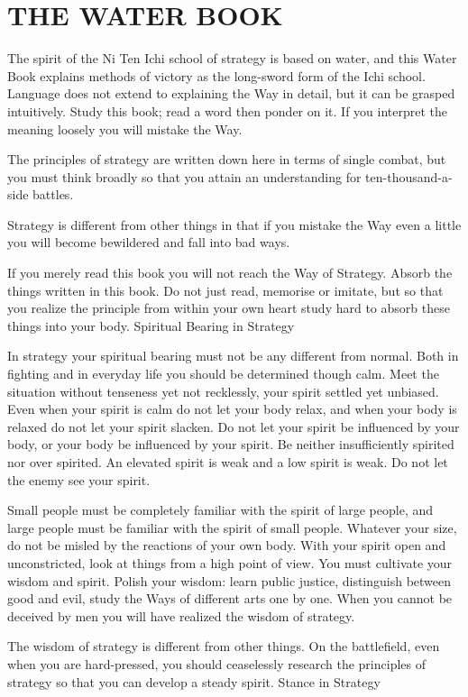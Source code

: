 \chapter{THE WATER BOOK}

The spirit of the Ni Ten Ichi school of strategy is based on water, and this Water Book explains methods of victory as the long-sword form of the Ichi school. Language does not extend to explaining the Way in detail, but it can be grasped intuitively. Study this book; read a word then ponder on it. If you interpret the meaning loosely you will mistake the Way.

The principles of strategy are written down here in terms of single combat, but you must think broadly so that you attain an understanding for ten-thousand-a-side battles.

Strategy is different from other things in that if you mistake the Way even a little you will become bewildered and fall into bad ways.

If you merely read this book you will not reach the Way of Strategy. Absorb the things written in this book. Do not just read, memorise or imitate, but so that you realize the principle from within your own heart study hard to absorb these things into your body.
Spiritual Bearing in Strategy

In strategy your spiritual bearing must not be any different from normal. Both in fighting and in everyday life you should be determined though calm. Meet the situation without tenseness yet not recklessly, your spirit settled yet unbiased. Even when your spirit is calm do not let your body relax, and when your body is relaxed do not let your spirit slacken. Do not let your spirit be influenced by your body, or your body be influenced by your spirit. Be neither insufficiently spirited nor over spirited. An elevated spirit is weak and a low spirit is weak. Do not let the enemy see your spirit.

Small people must be completely familiar with the spirit of large people, and large people must be familiar with the spirit of small people. Whatever your size, do not be misled by the reactions of your own body. With your spirit open and unconstricted, look at things from a high point of view. You must cultivate your wisdom and spirit. Polish your wisdom: learn public justice, distinguish between good and evil, study the Ways of different arts one by one. When you cannot be deceived by men you will have realized the wisdom of strategy.

The wisdom of strategy is different from other things. On the battlefield, even when you are hard-pressed, you should ceaselessly research the principles of strategy so that you can develop a steady spirit.
Stance in Strategy

